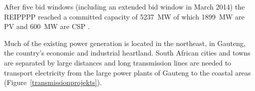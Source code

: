 After five bid windows (including an extended bid window in March 2014) the REIPPPP reached a committed capacity of \SI{5237}{\mega\watt} of which \SI{1899}{\mega\watt} are PV and \SI{600}{\mega\watt} are CSP \cite{DoE2015}.


Much of the existing power generation is located in the northeast, in Gauteng, the country's economic and industrial heartland. South African cities and towns are separated by large distances and long transmission lines are needed to transport electricity from the large power plants of Gauteng to the coastal areas (Figure~\ref{transmissionprojekts}). 


